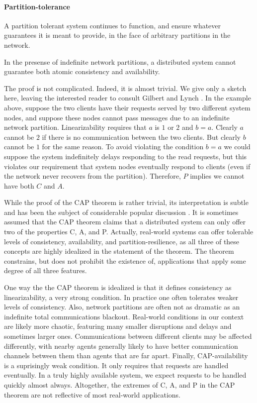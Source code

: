 \paragraph{Partition-tolerance}

A partition tolerant system continues to function, and ensure whatever
guarantees it is meant to provide, in the face of arbitrary partitions
in the network.

\begin{theorem}
In the presense of indefinite network partitions, a distributed system
cannot guarantee both atomic consistency and availability.
\end{theorem}

The proof is not complicated. Indeed, it is almost trivial. We give
only a sketch here, leaving the interested reader to consult Gilbert
and Lynch \cite{}. In the example above, suppose the two clients have
their requests served by two different system nodes, and suppose these
nodes cannot pass messages due to an indefinite network
partition. Linearizability requires that $a$ is $1$ or $2$ and $b =
a$.  Clearly $a$ cannot be $2$ if there is no communication between
the two clients. But clearly $b$ cannot be $1$ for the same reason.
To avoid violating the condition $b = a$ we could suppose the system
indefinitely delays responding to the read requests, but this violates
our requirement that system nodes eventually respond to clients (even
if the network never recovers from the partition). Therefore, $P$
implies we cannot have both $C$ and $A$.

While the proof of the CAP theorem is rather trivial, its
interpretation is subtle and has been the subject of considerable
popular discussion \cite{}. It is sometimes assumed that the CAP theorem
claims that a distributed system can only offer two of the properties
C, A, and P. Actually, real-world systems can offer tolerable levels
of consistency, availability, and partition-resilience, as all three
of these concepts are highly idealized in the statement of the
theorem. The theorem constrains, but does not prohibit the existence
of, applications that apply some degree of all three features.

One way the the CAP theorem is idealized is that it defines
consistency as linearizability, a very strong condition. In practice
one often tolerates weaker levels of consistency. Also, network
partitions are often not as dramatic as an indefinite total
communications blackout. Real-world conditions in our context are
likely more chaotic, featuring many smaller disruptions and delays and
sometimes larger ones. Communications between different clients may be
affected differently, with nearby agents generally likely to have
better communication channels between them than agents that are far
apart. Finally, CAP-availability is a suprisingly weak condition. It
only requires that requests are handled eventually. In a truly highly
available system, we expect requests to be handled quickly almost
always. Altogether, the extremes of C, A, and P in the CAP theorem are
not reflective of most real-world applications.

